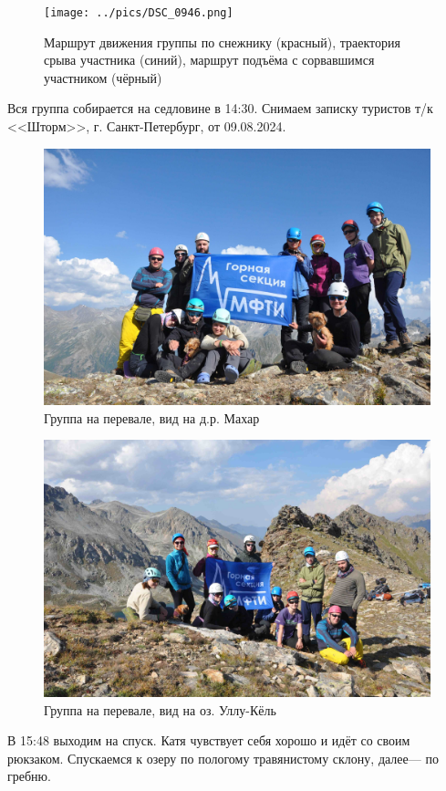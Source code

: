 \begin{figure}[h!]
	\centering
	\texttt{[image: ../pics/DSC\_0946.png]}
	\caption{Маршрут движения группы по снежнику (красный), траектория срыва участника (синий), маршрут подъёма с сорвавшимся участником (чёрный)}
	\label{fig:DSC_0946}
\end{figure}

Вся группа собирается на седловине в 14:30. Снимаем записку туристов т/к <<Шторм>>, г. Санкт-Петербург, от 09.08.2024.

\begin{figure}[h!]
	\centering
	\includegraphics[width=0.7\linewidth]{../pics/DSC_0982}
	\caption{Группа на перевале, вид на д.р. Махар}
	\label{fig:DSC_0982}
\end{figure}

\begin{figure}[h!]
	\centering
	\includegraphics[width=0.7\linewidth]{../pics/DSC_0986}
	\caption{Группа на перевале, вид на оз. Уллу-Кёль}
	\label{fig:DSC_0986}
\end{figure}


В 15:48 выходим на спуск. Катя чувствует себя хорошо и идёт со своим рюкзаком.
Спускаемся к озеру по пологому травянистому склону, далее--- по гребню.

